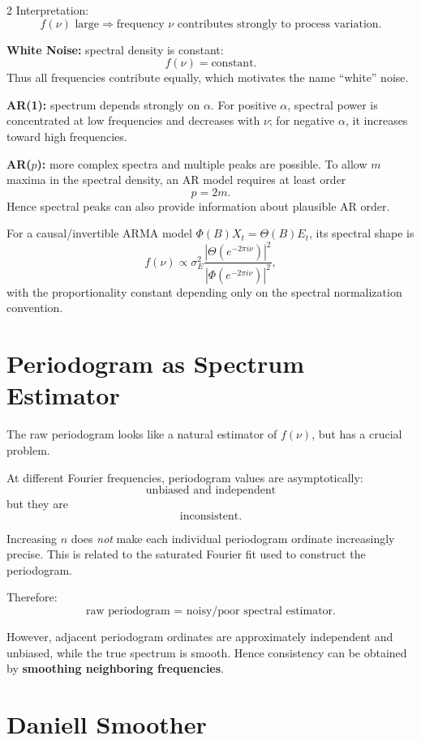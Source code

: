\documentclass[9pt,a4paper]{extarticle}
\newcommand{\key}[1]{\textbf{#1}}
\begin{document}
\begin{multicols}{2}
Interpretation:
\[
\boxed{
f(\nu)\text{ large}
\Rightarrow
\text{frequency }\nu\text{ contributes strongly to process variation}.
}
\]

\key{White Noise:} spectral density is constant:
\[
\boxed{f(\nu)=\text{constant}.}
\]
Thus all frequencies contribute equally, which motivates the name ``white'' noise.

\key{AR(1):} spectrum depends strongly on \(\alpha\). For positive \(\alpha\), spectral power is concentrated at low frequencies and decreases with \(\nu\); for negative \(\alpha\), it increases toward high frequencies.

\key{AR($p$):} more complex spectra and multiple peaks are possible. To allow \(m\) maxima in the spectral density, an AR model requires at least order
\[
\boxed{p=2m}.
\]
Hence spectral peaks can also provide information about plausible AR order.

For a causal/invertible ARMA model \(\Phi(B)X_t=\Theta(B)E_t\), its spectral shape is
\[
\boxed{f(\nu)\propto\sigma_E^2
\frac{|\Theta(e^{-2\pi i\nu})|^2}{|\Phi(e^{-2\pi i\nu})|^2},}
\]
with the proportionality constant depending only on the spectral normalization convention.

\section{Periodogram as Spectrum Estimator}

The raw periodogram looks like a natural estimator of \(f(\nu)\), but has a crucial problem.

At different Fourier frequencies, periodogram values are asymptotically:
\[
\boxed{\text{unbiased and independent}}
\]
but they are
\[
\boxed{\text{inconsistent}.}
\]

Increasing \(n\) does \emph{not} make each individual periodogram ordinate increasingly precise. This is related to the saturated Fourier fit used to construct the periodogram.

Therefore:
\[
\boxed{\text{raw periodogram = noisy/poor spectral estimator}.}
\]

However, adjacent periodogram ordinates are approximately independent and unbiased, while the true spectrum is smooth. Hence consistency can be obtained by \key{smoothing neighboring frequencies}.

\section{Daniell Smoother}


\end{multicols}
\end{document}
